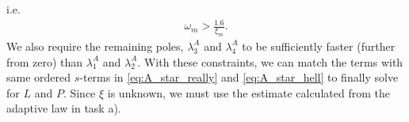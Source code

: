 \documentclass[]{article}
\begin{document}
i.e.
\begin{equation}\begin{aligned}
\omega_m > \frac{1.6}{\xi_m}.
\end{aligned}\end{equation}
We also require the remaining poles, $\lambda_3^A$ and $\lambda_4^A$ to be sufficiently faster (further from zero) than $\lambda_1^A$ and $\lambda_2^A$. With these constraints, we can match the terms with same ordered $s$-terms in \eqref{eq:A_star_really} and \eqref{eq:A_star_hell} to finally solve for $L$ and $P$. Since $\xi$ is unknown, we must use the estimate calculated from the adaptive law in task a).
\end{document}
